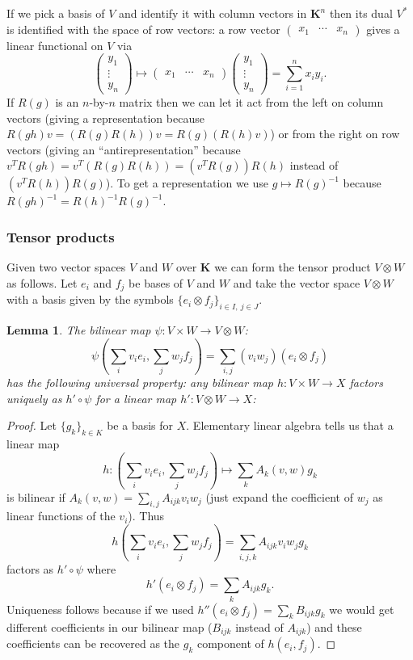 \documentclass[12pt]{article}
\newcommand{\KK}{\mathbf{K}}
\newcommand{\vrot}[3]{\left(\begin{array}{ccc}#1 & #2 & #3\end{array}\right)}
\newcommand{\vcot}[3]{\left(\begin{array}{c}#1\\ #2\\ #3\end{array}\right)}
\newtheorem{lma}[thm]{Lemma}
\theoremstyle{definition}
\theoremstyle{check}
\theoremstyle{remark}
\theoremstyle{TheoremNum}
\begin{document}
If we pick a basis of $V$ and identify it with column vectors in $\KK^n$ then its dual $V^*$ is identified with the space of row vectors: a row vector $\vrot{x_1}{\cdots}{x_n}$ gives a linear functional on $V$ via
\[\vcot{y_1}{\vdots}{y_n}\mapsto\vrot{x_1}{\cdots}{x_n}\vcot{y_1}{\vdots}{y_n}=\sum_{i=1}^nx_iy_i.\]
If $R(g)$ is an $n$-by-$n$ matrix then we can let it act from the left on column vectors (giving a representation because $R(gh)v=(R(g)R(h))v=R(g)(R(h)v)$) or from the right on row vectors (giving an ``antirepresentation'' because $v^TR(gh)=v^T(R(g)R(h))=(v^TR(g))R(h)$ instead of $(v^TR(h))R(g)$). To get a representation we use $g\mapsto R(g)^{-1}$ because $R(gh)^{-1}=R(h)^{-1}R(g)^{-1}$.


\subsubsection{Tensor products}

Given two vector spaces $V$ and $W$ over $\KK$ we can form the tensor product $V\otimes W$ as follows. Let $e_i$ and $f_j$ be bases of $V$ and $W$ and take the vector space $V\otimes W$ with a basis given by the symbols $\{e_i\otimes f_j\}_{i\in I,\ j\in J}$.

\begin{lma}
The bilinear map $\psi\colon V\times W\to V\otimes W$:
\[\psi\left(\sum_iv_ie_i,\sum_jw_jf_j\right)=\sum_{i,j}(v_iw_j)(e_i\otimes f_j)\]
has the following universal property: any bilinear map $h\colon V\times W\to X$ factors uniquely as $h'\circ\psi$ for a linear map $h'\colon V\otimes W\to X$:

\begin{center}\end{center}
\end{lma}
\begin{proof}
Let $\{g_k\}_{k\in K}$ be a basis for $X$. Elementary linear algebra tells us that a linear map
\[h\colon\left(\sum_iv_ie_i,\sum_jw_jf_j\right)\mapsto \sum_kA_k(v,w)g_k\]
is bilinear if $A_k(v,w)=\sum_{i,j}A_{ijk}v_iw_j$ (just expand the coefficient of $w_j$ as linear functions of the $v_i$). Thus
\[h\left(\sum_iv_ie_i,\sum_jw_jf_j\right)=\sum_{i,j,k}A_{ijk}v_iw_jg_k\]
factors as $h'\circ \psi$ where
\[h'(e_i\otimes f_j)=\sum_kA_{ijk}g_k.\]
Uniqueness follows because if we used $h''(e_i\otimes f_j)=\sum_kB_{ijk}g_k$ we would get different coefficients in our bilinear map ($B_{ijk}$ instead of $A_{ijk}$) and these coefficients can be recovered as the $g_k$ component of $h(e_i,f_j)$.
\end{proof}
\end{document}
